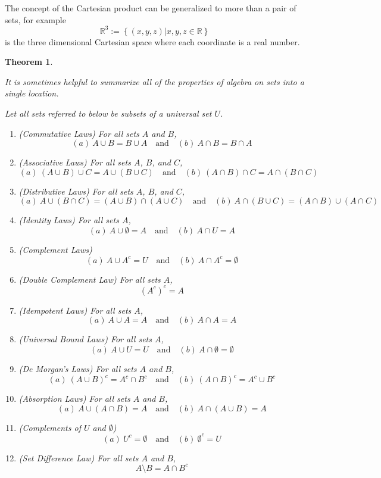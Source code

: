 \documentclass[
]{book}
\newtheorem{theorem}{Theorem}[chapter]
\theoremstyle{definition}
\theoremstyle{definition}
\theoremstyle{definition}
\theoremstyle{definition}
\theoremstyle{remark}
\begin{document}
The concept of the Cartesian product can be generalized to more than a pair of sets, for example \[\mathbb{R}^3:= \left\{ (x,y,z) \vert x,y,z\in \mathbb{R} \right\}\] is the three dimensional Cartesian space where each coordinate is a real number.

\begin{theorem}
\protect\hypertarget{thm:set-identities}{}\label{thm:set-identities}

It is sometimes helpful to summarize all of the properties of algebra on sets into a single location.

Let all sets referred to below be subsets of a universal set \(U\).

\begin{enumerate}
\def\labelenumi{\arabic{enumi}.}
\item
  (Commutative Laws) For all sets \(A\) and \(B\),
  \[(a) \: A \cup B = B \cup A \quad \mbox{and} \quad (b) \: A \cap B = B \cap A\]
\item
  (Associative Laws) For all sets \(A\), \(B\), and \(C\),
  \[(a) \: (A\cup B)\cup C = A \cup (B \cup C) \quad \mbox{and} \quad (b) \: (A \cap B) \cap C = A \cap (B\cap C)\]
\item
  (Distributive Laws) For all sets \(A\), \(B\), and \(C\),
  \[(a) \: A \cup (B \cap C) = (A \cup B)\cap (A \cup C) \quad \mbox{and} \quad (b) \: A \cap (B \cup C) = (A \cap B)\cup (A \cap C)\]
\item
  (Identity Laws) For all sets \(A\),
  \[(a) \: A \cup \emptyset = A \quad \mbox{and} \quad (b) \: A \cap U = A\]
\item
  (Complement Laws)
  \[(a) \: A \cup A^c = U \quad \mbox{and} \quad (b) \: A \cap A^c = \emptyset\]
\item
  (Double Complement Law) For all sets \(A\),
  \[(A^c)^c =A\]
\item
  (Idempotent Laws) For all sets \(A\),
  \[(a) \: A\cup A=A \quad \mbox{and} \quad (b) \: A \cap A =A\]
\item
  (Universal Bound Laws) For all sets \(A\),
  \[(a) \: A \cup U = U\quad \mbox{and} \quad (b) \: A \cap \emptyset = \emptyset\]
\item
  (De Morgan's Laws) For all sets \(A\) and \(B\),
  \[(a) \: (A \cup B)^c = A^c \cap B^c\quad \mbox{and} \quad (b) \: (A \cap B)^c = A^c \cup B^c\]
\item
  (Absorption Laws) For all sets \(A\) and \(B\),
  \[(a) \: A \cup (A \cap B) = A \quad \mbox{and} \quad (b) \: A \cap (A \cup B ) = A\]
\item
  (Complements of \(U\) and \(\emptyset\))
  \[(a) \: U^c = \emptyset \quad \mbox{and} \quad (b) \: \emptyset^c = U\]
\item
  (Set Difference Law) For all sets \(A\) and \(B\),
  \[A\setminus B = A \cap B^c\]
\end{enumerate}

\end{theorem}
\end{document}
